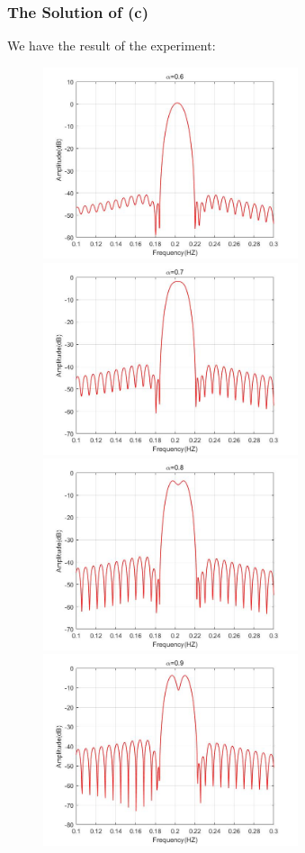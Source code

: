 \documentclass[UTF-8, a4paper, 12pt]{ctexart}
\begin{document}
\subsubsection{The Solution of (c)}
We have the result of the experiment:
\begin{figure}[htbp]
    \centering
    
    \includegraphics[width=7.5cm]{2/ham06.jpg}
    \includegraphics[width=7.5cm]{2/ham07.jpg}
    \includegraphics[width=7.5cm]{2/ham08.jpg}
    \includegraphics[width=7.5cm]{2/ham09.jpg}

\end{figure}
\end{document}
